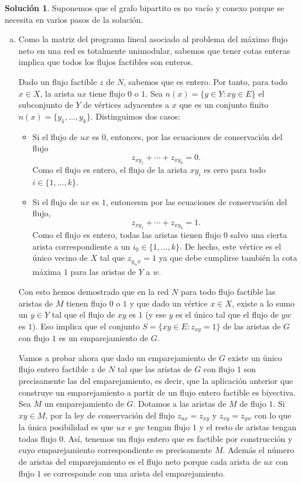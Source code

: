 \documentclass[10pt]{article}
\theoremstyle{definition}
\newtheorem*{sol}{Solución}
\begin{document}
\begin{sol} Suponemos que el grafo bipartito es no vacío y conexo porque se necesita en varios pasos de la solución.
\begin{enumerate}[(a)]
\item Como la matriz del programa lineal asociado al problema del máximo flujo neto en una red es totalmente unimodular, sabemos que tener cotas enteras implica que todos los flujos factibles son enteros.

Dado un flujo factible $z$ de $N$, sabemos que es entero. Por tanto, para todo $x\in X$, la arista $ux$ tiene flujo $0$ o $1$. Sea $n(x)=\{y\in Y : xy\in E\}$ el subconjunto de $Y$ de vértices adyacentes a $x$ que es un conjunto finito $n(x)=\{y_1,\ldots,y_k\}$. Distinguimos dos casos:
\begin{itemize}
\item Si el flujo de $ux$ es $0$, entonces, por las ecuaciones de conservación del flujo
$$z_{xy_1}+\cdots+z_{xy_k}=0.$$
Como el flujo es entero, el flujo de la arista $xy_i$ es cero para todo $i\in\{1,\ldots, k\}$.
\item Si el flujo de $ux$ es $1$, entoncesm por las ecuaciones de conservación del flujo,
$$z_{xy_1}+\cdots+z_{xy_k}=1.$$
Como el flujo es entero, todas las aristas tienen flujo $0$ salvo una cierta arista correspondiente a un $i_0\in\{1,\ldots, k\}$. De hecho, este vértice es el único vecino de $X$ tal que $z_{y_{i_0}x}=1$ ya que debe cumplirse también la cota máxima $1$ para las aristas de $Y$ a $w$.
\end{itemize}
Con esto hemos demostrado que en la red $N$ para todo flujo factible las aristas de $M$ tienen flujo $0$ o $1$ y que dado un vértice $x\in X$, existe a lo sumo un $y\in Y$ tal que el flujo de $xy$ es $1$ (y ese $y$ es el único tal que el flujo de $yw$ es $1$). Eso implica que el conjunto $S=\{xy\in E : z_{xy}=1\}$ de las aristas de $G$ con flujo $1$ es un emparejamiento de $G$.

Vamos a probar ahora que dado un emparejamiento de $G$ existe un único flujo entero factible $z$ de $N$ tal que las aristas de $G$ con flujo $1$ son precisamente las del emparejamiento, es decir, que la aplicación anterior que construye un emparejamiento a partir de un flujo entero factible es biyectiva. Sea $M$ un emparejamiento de $G$. Dotamos a las aristas de $M$ de flujo $1$. Si $xy\in M$, por la ley de conservación del flujo $z_{ux}=z_{xy}$ y $z_{xy}=z_{yw}$ con lo que la única posibilidad es que $ux$ e $yw$ tengan flujo $1$ y el resto de aristas tengan todas flujo $0$. Así, tenemos un flujo entero que es factible por construcción y cuyo emparejamiento correspondiente es precisamente $M$. Además el número de aristas del emparejamiento es el flujo neto porque cada arista de $ux$ con flujo $1$ se corresponde con una arista del emparejamiento.


\end{enumerate}
\end{sol}
\end{document}
